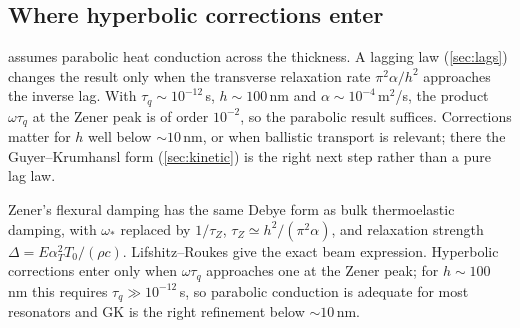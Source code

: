 \subsection{Where hyperbolic corrections enter}
 assumes parabolic heat conduction across the thickness. A lagging law (\cref{sec:lags}) changes the result only when the transverse relaxation rate $\pi^2\alpha/h^2$ approaches the inverse lag. With $\tau_q\sim10^{-12}$\,s, $h\sim100$\,nm and $\alpha\sim10^{-4}$\,m$^2$/s, the product $\omega\tau_q$ at the Zener peak is of order $10^{-2}$, so the parabolic result suffices. Corrections matter for $h$ well below $\sim 10$\,nm, or when ballistic transport is relevant; there the Guyer--Krumhansl form (\cref{sec:kinetic}) is the right next step rather than a pure lag law.

\begin{summarybox}[Summary]
Zener's flexural damping has the same Debye form as bulk thermoelastic damping, with $\omega_*$ replaced by $1/\tau_Z$, $\tau_Z\simeq h^2/(\pi^2\alpha)$, and relaxation strength $\Delta=E\alpha_T^2T_0/(\rho c)$. Lifshitz--Roukes give the exact beam expression. Hyperbolic corrections enter only when $\omega\tau_q$ approaches one at the Zener peak; for $h\sim100$\,nm this requires $\tau_q\gg10^{-12}$\,s, so parabolic conduction is adequate for most resonators and GK is the right refinement below $\sim10$\,nm.
\end{summarybox}
